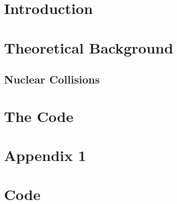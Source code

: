 
\tableofcontents
\clearpage

\pagestyle{scrheadings}
\ofoot[\pagemark]{\pagemark}
\cfoot[]{}

\setlength{\oddsidemargin}{8pt}
\setlength{\evensidemargin}{23pt}

%

\newpage
{}
\setcounter{page}{1}
\chapter{Introduction}
\label{sec:intro}


\chapter{Theoretical Background}
\label{sec:theory}
\section{Nuclear Collisions}
\label{sec:theory:nuc-col}


\chapter{The Code}
\label{sec:code}

%



\printnomenclature
{}


\newpage
\appendix
{}
\chapter{Appendix 1}
\label{app:brho}

\chapter{Code}
\label{app:code}

